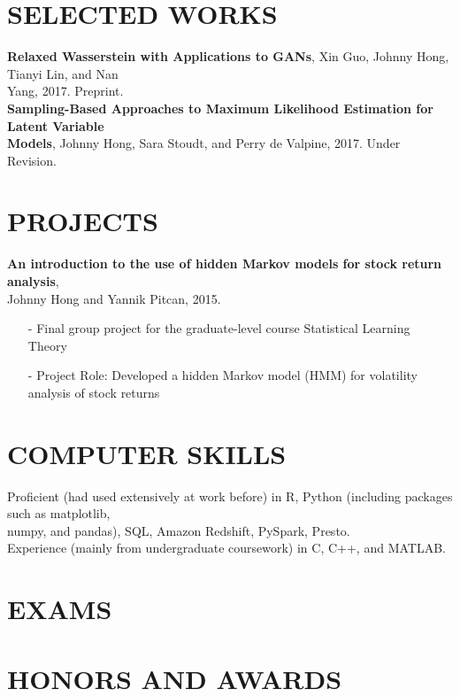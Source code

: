 \documentclass{res}
\begin{document}
\begin{resume}
\section{SELECTED WORKS}
\textbf{Relaxed Wasserstein with Applications to GANs}, Xin Guo, Johnny Hong, Tianyi Lin, and Nan \\Yang, 2017. Preprint.
\\
\textbf{Sampling-Based Approaches to Maximum Likelihood Estimation for Latent Variable \\Models}, Johnny Hong, Sara Stoudt, and Perry de Valpine, 2017. Under Revision.

\section{PROJECTS}
\textbf{An introduction to the use of hidden Markov models for stock return analysis}, \\Johnny Hong and Yannik Pitcan, 2015.
            \begin{itemize}\setlength\itemsep{0em}
            \item[-] Final group project for the graduate-level course Statistical Learning Theory
            \item[-] Project Role: Developed a hidden Markov model (HMM) for volatility analysis of stock returns
            \end{itemize}
            
\section{COMPUTER SKILLS}          
    Proficient (had used extensively at work before) in R, Python (including packages such as matplotlib, \\numpy, and pandas), SQL, Amazon Redshift, PySpark, Presto. \\
    Experience (mainly from undergraduate coursework) in C, C++, and MATLAB. \\

\section{EXAMS}
 
\section{HONORS AND AWARDS}        
    \\
     \\
     \\
    \\
     \\
 

\end{resume}
\end{document}
